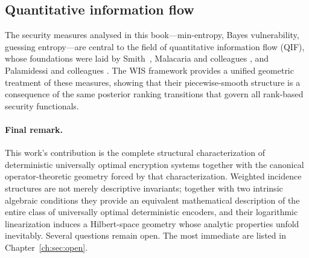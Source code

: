\subsection*{Quantitative information flow}
The security measures analysed in this book---min-entropy, Bayes
vulnerability, guessing entropy---are central to the field of
quantitative information flow (QIF), whose foundations were laid
by Smith~\cite{smith2009foundations}, Malacaria and colleagues
\cite{malacaria2007assessing, clark2007static}, and Palamidessi and
colleagues \cite{chatzikokolakis2005probability, alvim2012information,
alvim2023information}.  The WIS framework provides a unified geometric
treatment of these measures, showing that their piecewise-smooth
structure is a consequence of the same posterior ranking transitions
that govern all rank-based security functionals.
\paragraph{Final remark.}  This work's contribution is the complete
structural characterization of deterministic universally optimal
encryption systems together with the canonical operator-theoretic
geometry forced by that characterization.  Weighted incidence
structures are not merely descriptive invariants; together with two
intrinsic algebraic conditions they provide an equivalent mathematical
description of the entire class of universally optimal deterministic
encoders, and their logarithmic linearization induces a Hilbert-space
geometry whose analytic properties unfold inevitably.
Several questions remain open.  The most immediate are listed in
Chapter~\ref{ch:sec:open}.
\endinput
